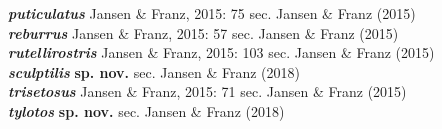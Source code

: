 \documentclass[fleqn,10pt,lineno]{wlpeerj} %
\begin{document}
\begin{tabbing}
			\> \textbf{\textit{puticulatus}} Jansen \& Franz, 2015: 75 sec. Jansen \& Franz (2015)\\
			\> \textbf{\textit{reburrus}} Jansen \& Franz, 2015: 57 sec. Jansen \& Franz (2015)\\
			\> \textbf{\textit{rutellirostris}} Jansen \& Franz, 2015: 103 sec. Jansen \& Franz (2015)\\
			\> \textbf{\textit{sculptilis}} \textbf{sp. nov.} sec. Jansen \& Franz (2018)\\
			\> \textbf{\textit{trisetosus}} Jansen \& Franz, 2015: 71 sec. Jansen \& Franz (2015)\\
			\> \textbf{\textit{tylotos}} \textbf{sp. nov.} sec. Jansen \& Franz (2018)\\
	\end{tabbing}
	
\end{document}
